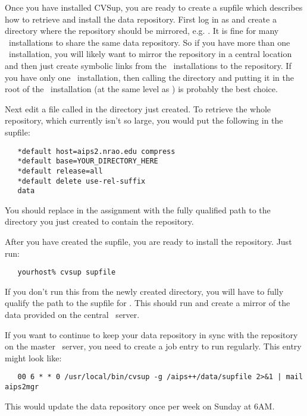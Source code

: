 Once you have installed CVSup, you are ready to create a supfile which describes
how to retrieve and install the data repository. First log in as 
and create a directory where the repository should be mirrored, e.g. .
It is fine for many \aipspp\ installations to share the same data repository. So if
you have more than one \aipspp\ installation, you will likely want to mirror the
repository in a central location and then just create symbolic links from the
\aipspp\ installations to the repository. If you have only one \aipspp\ installation,
then calling the directory  and putting it in the root of the
\aipspp\ installation (at the same level as ) is probably the best choice.

Next edit a file called  in the directory just created. To retrieve the whole
repository, which currently isn't so large, you would put the following in the supfile:

\begin{verbatim}
   *default host=aips2.nrao.edu compress
   *default base=YOUR_DIRECTORY_HERE
   *default release=all
   *default delete use-rel-suffix
   data
\end{verbatim}

\noindent
You should replace  in the  assignment with
the fully qualified path to the directory you just created to contain the repository.

After you have created the supfile, you are ready to install the repository. Just
run:

\begin{verbatim}
   yourhost% cvsup supfile
\end{verbatim}

\noindent
If you don't run this from the newly created directory, you will
have to fully qualify the path to the supfile for . This should run
and create a mirror of the data provided on the central \aipspp\ server.

If you want to continue to keep your data repository in sync with the repository
on the master \aipspp\ server, you need to create a  job entry to
run  regularly. This entry might look like:

\begin{verbatim}
   00 6 * * 0 /usr/local/bin/cvsup -g /aips++/data/supfile 2>&1 | mail aips2mgr
\end{verbatim}

\noindent
This would update the data repository once per week on Sunday at 6AM.

